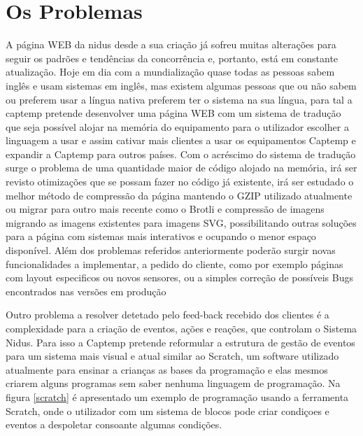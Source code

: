 \section{Os Problemas}
A página WEB da nidus desde a sua criação já sofreu muitas alterações para seguir os padrões e tendências da concorrência e, portanto, está em constante atualização. Hoje em dia com a mundialização quase todas as pessoas sabem inglês e usam sistemas em inglês, mas existem algumas pessoas que ou não sabem ou preferem usar a língua nativa preferem ter o sistema na sua língua, para tal a captemp pretende desenvolver uma página WEB com um sistema de tradução que seja possível alojar na memória do equipamento para o utilizador escolher a linguagem a usar e assim cativar mais clientes a usar os equipamentos Captemp e expandir a Captemp para outros países. Com o acréscimo do sistema de tradução surge o problema de uma quantidade maior de código alojado na memória, irá ser revisto otimizações que se possam fazer no código já existente, irá ser estudado o melhor método de compressão da página mantendo o GZIP utilizado atualmente ou migrar para outro mais recente como o Brotli e compressão de imagens migrando as imagens existentes para imagens SVG, possibilitando outras soluções para a página com sistemas mais interativos e ocupando o menor espaço disponível. Além dos problemas referidos anteriormente poderão surgir novas funcionalidades a implementar, a pedido do cliente, como por exemplo páginas com layout especificos ou novos sensores, ou a simples correção de possíveis Bugs encontrados nas versões em produção
\par
Outro problema a resolver detetado pelo feed-back recebido dos clientes é a complexidade para a criação de eventos, ações e reações, que controlam o Sistema Nidus. Para isso a Captemp pretende reformular a estrutura de gestão de eventos para um sistema mais visual  e atual similar ao Scratch, um software utilizado atualmente para ensinar a crianças as bases da programação e elas mesmos criarem alguns programas sem saber nenhuma linguagem de programação. Na figura \ref{scratch} é apresentado um exemplo de programação usando a ferramenta Scratch, onde o utilizador com um sistema de blocos pode criar condiçoes e eventos a despoletar consoante algumas condições.
